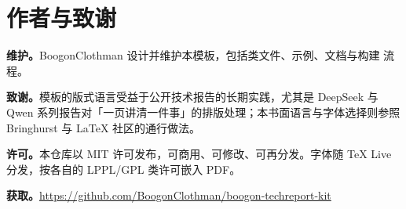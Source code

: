 \section{作者与致谢}
\label{app:authors}

\textbf{维护。}BoogonClothman 设计并维护本模板，包括类文件、示例、文档与构建
流程。

\textbf{致谢。}模板的版式语言受益于公开技术报告的长期实践，尤其是 DeepSeek 与
Qwen 系列报告对「一页讲清一件事」的排版处理；本书面语言与字体选择则参照
Bringhurst 与 \LaTeX{} 社区的通行做法\citep{bringhurst2013elements,mittelbach2023companion}。

\textbf{许可。}本仓库以 MIT 许可发布，可商用、可修改、可再分发。字体随
TeX Live 分发，按各自的 LPPL/GPL 类许可嵌入 PDF。

\textbf{获取。}\url{https://github.com/BoogonClothman/boogon-techreport-kit}
